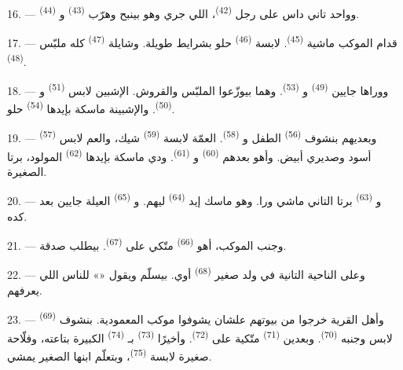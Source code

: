 16. --- وواحد تاني داس على رجل  \textsuperscript{(42)}، اللي جري وهو
بينبح وهرّب  \textsuperscript{(43)} و
\textsuperscript{(44)}.

\VUsaut{5.0mm}
\VUsaut{4.0mm}

17. --- قدام الموكب ماشية  \textsuperscript{(45)}. لابسة
 \textsuperscript{(46)} حلو بشرايط طويلة. وشايلة 
\textsuperscript{(47)} كله ملبّس  \textsuperscript{(48)}.

18. --- ووراها جايين  \textsuperscript{(49)} و
\textsuperscript{(53)}. وهما بيوزّعوا الملبّس والقروش. الإشبين لابس
 \textsuperscript{(51)} و \textsuperscript{(50)}.
والإشبينة ماسكة بإيدها  \textsuperscript{(54)} حلو.

19. --- وبعديهم بنشوف  \textsuperscript{(56)} الطفل و
\textsuperscript{(58)}. العمّة لابسة  \textsuperscript{(59)} شيك، والعم
لابس  \textsuperscript{(57)} أسود وصديري أبيض. وأهو بعدهم  \textsuperscript{(60)} و \textsuperscript{(61)}. ودي ماسكة بإيدها
 \textsuperscript{(62)} المولود، برتا الصغيرة.

20. --- و \textsuperscript{(63)} برتا التاني ماشي ورا. وهو ماسك إيد
 \textsuperscript{(64)} ليهم. و \textsuperscript{(65)} العيلة
جايين بعد كده.

\VUsaut{4.6mm}
\VUsaut{3.4mm}

21. --- وجنب الموكب، أهو  \textsuperscript{(66)} متّكي على
 \textsuperscript{(67)}. بيطلب صدقة.

22. --- وعلى الناحية التانية في ولد صغير  \textsuperscript{(68)} أوي.
بيسلّم ويقول «» للناس اللي يعرفهم.

23. --- وأهل القرية خرجوا من بيوتهم علشان يشوفوا موكب المعمودية. بنشوف
 \textsuperscript{(69)} لابس  وجنبه
 \textsuperscript{(70)}. وبعدين  \textsuperscript{(71)} متّكية
على  \textsuperscript{(72)}. وأخيرًا  \textsuperscript{(73)}
بـ \textsuperscript{(74)} الكبيرة بتاعته، وفلّاحة صغيرة لابسة
 \textsuperscript{(75)}، وبتعلّم ابنها الصغير يمشي.

